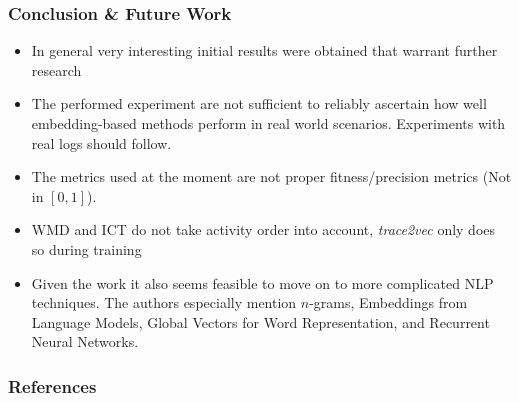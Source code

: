 \documentclass{beamer}
\begin{document}
\begin{frame}
	\frametitle{Conclusion \& Future Work}
	\begin{itemize}
		\item In general very interesting initial results were obtained that warrant further research
		\item The performed experiment are not sufficient to reliably ascertain how well embedding-based methods perform in real world scenarios. Experiments with real logs should follow.
		\item The metrics used at the moment are not proper fitness/precision metrics (Not in $[0,1]$).
		\item WMD and ICT do not take activity order into account, \emph{trace2vec} only does so during training
		\item Given the work it also seems feasible to move on to more complicated NLP techniques. The authors especially mention $n$-grams, Embeddings from Language Models, Global Vectors for Word Representation, and Recurrent Neural Networks.
	\end{itemize}

\begin{frame}[allowframebreaks]
	\frametitle{References}
	
	
\end{frame}
\end{frame}
	
\end{document}
